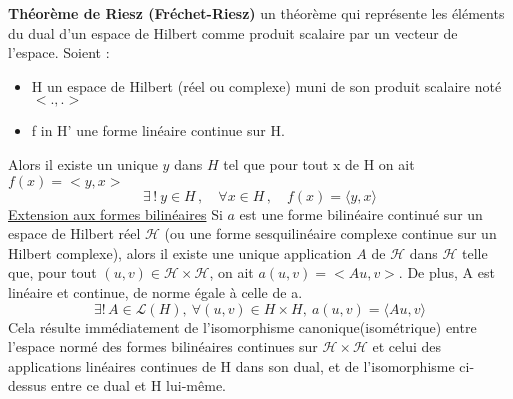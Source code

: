 \documentclass{book}
\begin{document}
\textbf{Th\'eor\`eme de Riesz (Fr\'echet-Riesz)}\newline
un th\'eor\`eme qui repr\'esente les \'el\'ements du dual d'un espace de Hilbert comme produit scalaire par un vecteur de l'espace.
Soient :
\begin{itemize}
	\item H un espace de Hilbert (r\'eel ou complexe) muni de son produit scalaire not\'e $<.,.>$
	\item f in H' une forme lin\'eaire continue sur H.
\end{itemize}
Alors il existe un unique $y$ dans $H$ tel que pour tout x de H on ait $f(x) = <y, x>$
$$
\exists\,!\ y \in H\,, \quad \forall x\in H\,, \quad f(x) = \langle y,x\rangle
$$
\underline{Extension aux formes bilin\'eaires}\newline
Si $a$ est une forme bilin\'eaire continu\'e sur un espace de Hilbert r\'eel $\mathcal{H}$ (ou une forme sesquilin\'eaire complexe continue sur un Hilbert complexe),
alors il existe une unique application $A$ de $\mathcal{H}$ dans $\mathcal{H}$ telle que,
pour tout $(u, v) \in \mathcal{H} \times \mathcal{H}$, on ait $a(u, v) = <Au, v>$.
De plus, A est lin\'eaire et continue, de norme \'egale \`a celle de a.
$$ \exists !\,A\in\mathcal{L}(H),\ \forall (u,v)\in H\times H,\ a(u,v)=\langle Au,v \rangle $$
Cela r\'esulte imm\'ediatement de l'isomorphisme canonique(isom\'etrique) entre l'espace norm\'e des formes bilin\'eaires continues sur
$\mathcal{H} \times \mathcal{H}$ et celui des applications lin\'eaires continues de H dans son dual, et de l'isomorphisme ci-dessus entre ce dual et H lui-m\^eme.
\bigskip
\end{document}
